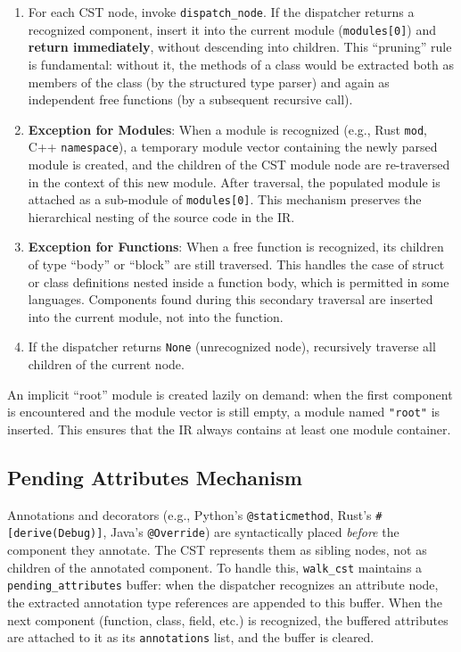 \begin{enumerate}
  \item For each CST node, invoke \texttt{dispatch\_node}. If the
    dispatcher returns a recognized component, insert it into the
    current module (\texttt{modules[0]}) and \textbf{return
    immediately}, without descending into children. This ``pruning''
    rule is fundamental: without it, the methods of a class would be
    extracted both as members of the class (by the structured type
    parser) and again as independent free functions (by a subsequent
    recursive call).
  \item \textbf{Exception for Modules}: When a module is recognized
    (e.g., Rust \texttt{mod}, C++ \texttt{namespace}), a temporary
    module vector containing the newly parsed module is created, and
    the children of the CST module node are re-traversed in the
    context of this new module. After traversal, the populated module
    is attached as a sub-module of \texttt{modules[0]}. This
    mechanism preserves the hierarchical nesting of the source code in the IR.
  \item \textbf{Exception for Functions}: When a free function is
    recognized, its children of type ``body'' or ``block'' are still
    traversed. This handles the case of struct or class definitions
    nested inside a function body, which is permitted in some
    languages. Components found during this secondary traversal are
    inserted into the current module, not into the function.
  \item If the dispatcher returns \texttt{None} (unrecognized node),
    recursively traverse all children of the current node.
\end{enumerate}

An implicit ``root'' module is created lazily on demand: when the
first component is encountered and the module vector is still empty,
a module named \texttt{"root"} is inserted. This ensures that the IR
always contains at least one module container.

\subsection{Pending Attributes Mechanism}

Annotations and decorators (e.g., Python's \texttt{@staticmethod},
Rust's \texttt{\#[derive(Debug)]}, Java's \texttt{@Override}) are
syntactically placed \textit{before} the component they annotate. The
CST represents them as sibling nodes, not as children of the
annotated component. To handle this, \texttt{walk\_cst} maintains a
\texttt{pending\_attributes} buffer: when the dispatcher recognizes
an attribute node, the extracted annotation type references are
appended to this buffer. When the next component (function, class,
field, etc.) is recognized, the buffered attributes are attached to
it as its \texttt{annotations} list, and the buffer is cleared.

